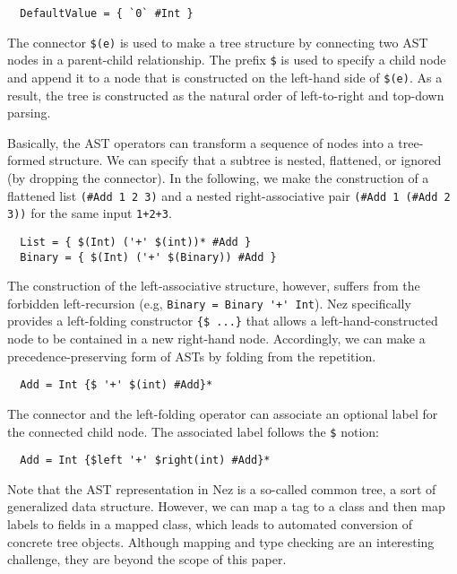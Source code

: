 \documentclass[preprint]{sigplanconf}
\begin{document}
\begin{verbatim}
  DefaultValue = { `0` #Int }
\end{verbatim}

The connector \verb|$(e)| is used to make a tree structure by connecting two AST nodes in a parent-child relationship. The prefix \verb|$| is used to specify a child node and append it to a node that is constructed on  the left-hand side of \verb|$(e)|.  As a result, the tree is constructed as the natural order of left-to-right and top-down parsing. 

Basically, the AST operators can transform a sequence of nodes into a tree-formed structure. We can specify that a subtree is nested, flattened, or ignored (by dropping the connector). In the following, we make the construction of a flattened list \verb|(#Add 1 2 3)| and a nested right-associative pair \verb|(#Add 1 (#Add 2 3))| for the same input \verb|1+2+3|.

\begin{verbatim}
  List = { $(Int) ('+' $(int))* #Add }
  Binary = { $(Int) ('+' $(Binary)) #Add }
\end{verbatim}

The construction of the left-associative structure, however, suffers from the forbidden left-recursion (e.g, {\tt Binary = Binary \verb|'+'| Int}). Nez specifically  provides a left-folding constructor \verb|{$ ...}| that allows a left-hand-constructed node to be contained in a new right-hand node. Accordingly, we can make a precedence-preserving form of ASTs by folding from the repetition. 

\begin{verbatim}
  Add = Int {$ '+' $(int) #Add}* 
\end{verbatim}

The connector and the left-folding operator can associate an optional label for the connected child node. The associated label follows the \verb|$| notion:

\begin{verbatim}
  Add = Int {$left '+' $right(int) #Add}* 
\end{verbatim}

Note that the AST representation in Nez is a so-called common tree, a sort of generalized data structure. However, we can map a tag to a class and then map labels to fields in a mapped class, which leads to automated conversion of concrete tree objects. Although mapping and type checking are an interesting challenge, they are beyond the scope of this paper. 
\end{document}
